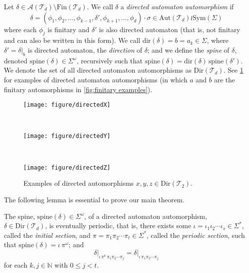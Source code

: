 Let $\delta \in \mathcal{A}\!\left(\mathcal{T}_d\right) \setminus \mathrm{Fin}\!\left(\mathcal{T}_d\right)$. We call $\delta$ a \emph{directed automaton automorphism} if
\begin{equation}
	\label{eq:directed automorphism definition}
	\delta
	=
	(\phi_1, \phi_2, \ldots, \phi_{k-1}, \delta', \phi_{k+1}, \ldots, \phi_d) \cdot \sigma
	\in
	\mathrm{Aut}\!\left(\mathcal{T}_d\right) \wr \mathrm{Sym}(\Sigma)
\end{equation}
where each $\phi_j$ is finitary and $\delta'$ is also directed automaton (that is, not finitary and can also be written in this form).
We call $\mathrm{dir}(\delta) = b = a_k \in \Sigma$, where $\delta'=\delta\vert_{b}$ is directed automaton, the \emph{direction} of $\delta$; and we define the \emph{spine} of $\delta$, denoted $\mathrm{spine}(\delta) \in \Sigma^\omega$, recursively such that $\mathrm{spine}(\delta) = \mathrm{dir}(\delta) \, \mathrm{spine}(\delta')$.
We denote the set of all directed automaton automorphisms as $\mathrm{Dir}(\mathcal{T}_d)$.
See \cref{fig:directed examples} for examples of directed automaton automorphisms (in which $a$ and $b$ are the finitary automorphisms in \cref{fig:finitary examples}).

\begin{figure}[!ht]
	\centering
	\begin{minipage}[t]{.3\linewidth}
		\centering
		\texttt{[image: figure/directedX]}
	\end{minipage}
	~
	\begin{minipage}[t]{.3\linewidth}
		\centering
		\texttt{[image: figure/directedY]}
	\end{minipage}
	~
	\begin{minipage}[t]{.3\linewidth}
		\centering
		\texttt{[image: figure/directedZ]}
	\end{minipage}
	\caption{Examples of directed automorphisms $x,y,z \in \mathrm{Dir}(\mathcal{T}_2)$.}
	\label{fig:directed examples}
\end{figure}

The following lemma is essential to prove our main theorem.

\begin{lemma}
	\label{lemma:spine is eventualy periodic}
	The spine, $\mathrm{spine}(\delta) \in \Sigma^\omega$, of a directed automaton automorphism, $\delta \in \mathrm{Dir}(\mathcal{T}_d)$, is eventually periodic, that is, there exists some $\iota = \iota_1 \iota_2 \cdots \iota_s \in \Sigma^*$, called the \emph{initial section}, and
	$\pi = \pi_1 \pi_2 \cdots \pi_t \in \Sigma^*$, called the \emph{periodic section}, such that $\mathrm{spine}(\delta) = \iota \, \pi^\omega$; and
	\begin{equation}
		\label{eq:restrictions along periodic section}
		\left.
		\delta
		\right\vert_{\iota \, \pi^k \, \pi_1 \pi_2 \cdots \pi_j}
		=
		\left.
		\delta
		\right\vert_{\iota \, \pi_1 \pi_2 \cdots \pi_j}
	\end{equation}
	for each $k,j \in \mathbb{N}$ with $0\leq j <t$.
\end{lemma}

